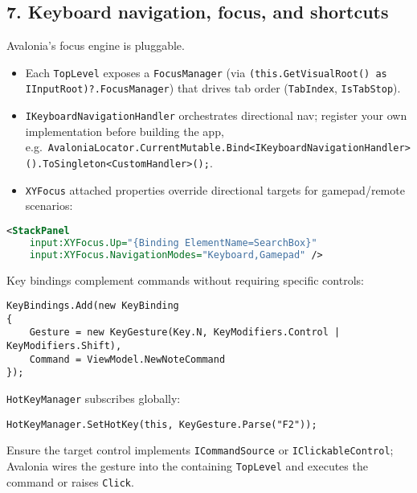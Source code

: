 \subsection{7. Keyboard navigation, focus, and
shortcuts}\label{keyboard-navigation-focus-and-shortcuts}

Avalonia's focus engine is pluggable.

\begin{itemize}
\tightlist
\item
  Each \passthrough{\lstinline!TopLevel!} exposes a
  \passthrough{\lstinline!FocusManager!} (via
  \passthrough{\lstinline!(this.GetVisualRoot() as IInputRoot)?.FocusManager!})
  that drives tab order (\passthrough{\lstinline!TabIndex!},
  \passthrough{\lstinline!IsTabStop!}).
\item
  \passthrough{\lstinline!IKeyboardNavigationHandler!} orchestrates
  directional nav; register your own implementation before building the
  app,
  e.g.~\passthrough{\lstinline!AvaloniaLocator.CurrentMutable.Bind<IKeyboardNavigationHandler>().ToSingleton<CustomHandler>();!}.
\item
  \passthrough{\lstinline!XYFocus!} attached properties override
  directional targets for gamepad/remote scenarios:
\end{itemize}

\begin{lstlisting}[language=XML]
<StackPanel
    input:XYFocus.Up="{Binding ElementName=SearchBox}"
    input:XYFocus.NavigationModes="Keyboard,Gamepad" />
\end{lstlisting}

Key bindings complement commands without requiring specific controls:

\begin{lstlisting}
KeyBindings.Add(new KeyBinding
{
    Gesture = new KeyGesture(Key.N, KeyModifiers.Control | KeyModifiers.Shift),
    Command = ViewModel.NewNoteCommand
});
\end{lstlisting}

\passthrough{\lstinline!HotKeyManager!} subscribes globally:

\begin{lstlisting}
HotKeyManager.SetHotKey(this, KeyGesture.Parse("F2"));
\end{lstlisting}

Ensure the target control implements
\passthrough{\lstinline!ICommandSource!} or
\passthrough{\lstinline!IClickableControl!}; Avalonia wires the gesture
into the containing \passthrough{\lstinline!TopLevel!} and executes the
command or raises \passthrough{\lstinline!Click!}.


